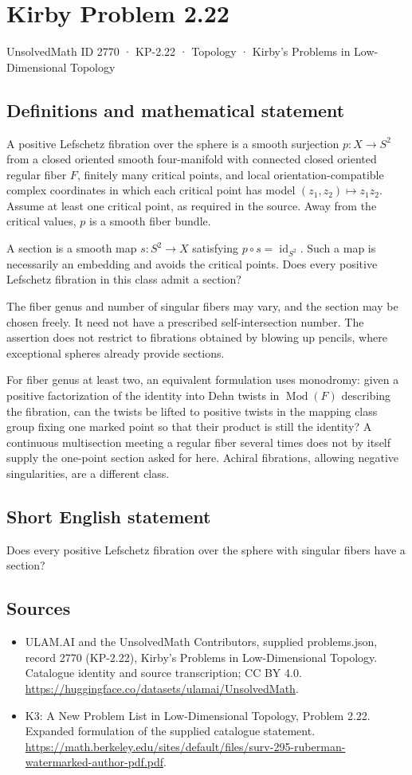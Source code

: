 \documentclass[11pt,a4paper]{article}
\begin{document}
\section*{Kirby Problem 2.22}\label{2770}
{\small UnsolvedMath ID 2770 · KP-2.22 · Topology · Kirby's Problems in Low-Dimensional Topology}
\subsection{Definitions and mathematical statement}
A positive Lefschetz fibration over the sphere is a smooth surjection $p:X\to S^2$ from a closed oriented smooth four-manifold with connected closed oriented regular fiber $F$, finitely many critical points, and local orientation-compatible complex coordinates in which each critical point has model $(z_1,z_2)\mapsto z_1z_2$. Assume at least one critical point, as required in the source. Away from the critical values, $p$ is a smooth fiber bundle.

A section is a smooth map $s:S^2\to X$ satisfying $p\circ s=\operatorname{id}_{S^2}$. Such a map is necessarily an embedding and avoids the critical points. Does every positive Lefschetz fibration in this class admit a section?

The fiber genus and number of singular fibers may vary, and the section may be chosen freely. It need not have a prescribed self-intersection number. The assertion does not restrict to fibrations obtained by blowing up pencils, where exceptional spheres already provide sections.

For fiber genus at least two, an equivalent formulation uses monodromy: given a positive factorization of the identity into Dehn twists in $\operatorname{Mod}(F)$ describing the fibration, can the twists be lifted to positive twists in the mapping class group fixing one marked point so that their product is still the identity? A continuous multisection meeting a regular fiber several times does not by itself supply the one-point section asked for here. Achiral fibrations, allowing negative singularities, are a different class.
\subsection{Short English statement}
Does every positive Lefschetz fibration over the sphere with singular fibers have a section?
\subsection{Sources}
\begin{itemize}
\item[S1] ULAM.AI and the UnsolvedMath Contributors, supplied problems.json, record 2770 (KP-2.22), Kirby's Problems in Low-Dimensional Topology. Catalogue identity and source transcription; CC BY 4.0.
\url{https://huggingface.co/datasets/ulamai/UnsolvedMath}.
\item[S2] K3: A New Problem List in Low-Dimensional Topology, Problem 2.22. Expanded formulation of the supplied catalogue statement.
\url{https://math.berkeley.edu/sites/default/files/surv-295-ruberman-watermarked-author-pdf.pdf}.
\end{itemize}
\end{document}

